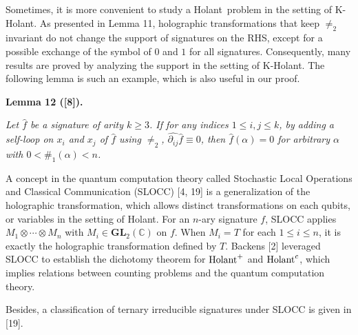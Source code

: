 


Sometimes, it is more convenient to study a Holant problem in the setting of K-Holant. As presented in Lemma 11, holographic transformations that keep $\neq_{2}$ invariant do not change the support of signatures on the RHS, except for a possible exchange of the symbol of $0$ and $1$ for all signatures. Consequently, many results are proved by analyzing the support in the setting of K-Holant. The following lemma is such an example, which is also useful in our proof.\par





\par\medskip\noindent\textbf{
\textbf{Lemma 12}\textbf{ }([8])\textbf{.}
}\par



{\itshape Let $\widehat{f}$ be a signature of arity $k\geq 3$. If for any indices $1\leq i,j\leq k$, by adding a self-loop on $x_{i}$ and $x_{j}$ of $\widehat{f}$ using $\neq_{2}$, $\widehat{\partial_{ij}}\widehat{f}\equiv 0$, then $\widehat{f}(\alpha)=0$ for arbitrary $\alpha$ with $0<\#_{1}(\alpha)<n$.}\par






A concept in the quantum computation theory called Stochastic Local Operations and Classical Communication (SLOCC) [4, 19] is a generalization of the holographic transformation, which allows distinct transformations on each qubits, or variables in the setting of Holant. For an $n$-ary signature $f$, SLOCC applies $M_{1}\otimes\cdots\otimes M_{n}$ with $M_{i}\in\mathbf{GL}_{2}(\mathbb{C})$ on $f$. When $M_{i}=T$ for each $1\leq i\leq n$, it is exactly the holographic transformation defined by $T$. Backens [2] leveraged SLOCC to establish the dichotomy theorem for $\textup{{Holant}}^{+}$ and $\textup{{Holant}}^{c}$, which implies relations between counting problems and the quantum computation theory.\par




Besides, a classification of ternary irreducible signatures under SLOCC is given in [19].\par



